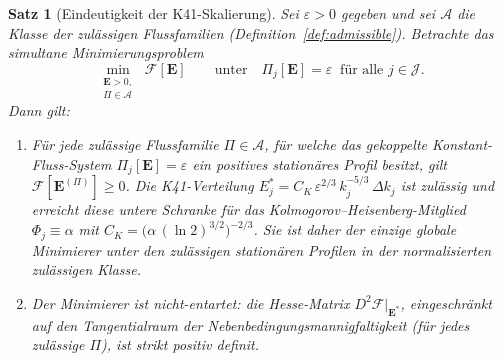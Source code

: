 \documentclass[12pt,a4paper]{article}
\theoremstyle{breakdef}
\theoremstyle{breakplain}
\newtheorem{theorem}[definition]{Satz}
\theoremstyle{breakdef}
\begin{document}
\begin{theorem}[Eindeutigkeit der K41-Skalierung]\label{thm:K41}
Sei $\varepsilon > 0$ gegeben und sei $\mathscr{A}$ die Klasse der
zulässigen Flussfamilien (Definition~\ref{def:admissible}).
Betrachte das \emph{simultane} Minimierungsproblem
\begin{equation}\label{eq:min}
  \min_{\substack{\mathbf{E} > 0,\\ \Pi \in \mathscr{A}}}
  \;\mathcal{F}[\mathbf{E}]
  \qquad \text{unter} \quad
  \Pi_j[\mathbf{E}] = \varepsilon
  \;\;\text{für alle } j \in \mathcal{J}.
\end{equation}
Dann gilt:
\begin{enumerate}
  \item[\textup{(i)}]
    Für jede zulässige Flussfamilie $\Pi \in \mathscr{A}$, für welche das
    gekoppelte Konstant-Fluss-System $\Pi_j[\mathbf{E}] = \varepsilon$
    ein positives stationäres Profil besitzt, gilt
    $\mathcal{F}[\mathbf{E}^{(\Pi)}]\ge0$. Die K41-Verteilung
    $E_j^* = C_K\,\varepsilon^{2/3}\,k_j^{-5/3}\,\Delta k_j$
    ist zulässig und erreicht diese untere Schranke für das
    Kolmogorov--Heisenberg-Mitglied $\Phi_j \equiv \alpha$ mit
    $C_K = \bigl(\alpha\,(\ln 2)^{3/2}\bigr)^{-2/3}$. Sie ist daher der
    einzige globale Minimierer unter den zulässigen stationären Profilen
    in der normalisierten zulässigen Klasse.
  \item[\textup{(ii)}]
    Der Minimierer ist nicht-entartet: die Hesse-Matrix
    $D^2\mathcal{F}|_{\mathbf{E}^*}$, eingeschränkt auf den Tangentialraum
    der Nebenbedingungsmannigfaltigkeit (für jedes zulässige $\Pi$), ist
    strikt positiv definit.
\end{enumerate}
\end{theorem}
\end{document}
